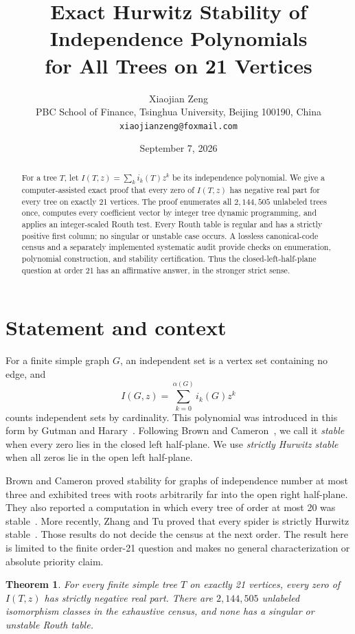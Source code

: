 \documentclass[11pt]{article}
\title{Exact Hurwitz Stability of Independence Polynomials\\
for All Trees on 21 Vertices}
\author{Xiaojian Zeng\\
\small PBC School of Finance, Tsinghua University, Beijing 100190, China\\
\small \texttt{xiaojianzeng@foxmail.com}}
\date{September 7, 2026}
\newtheorem{theorem}{Theorem}
\begin{document}
\maketitle

\begin{abstract}
For a tree $T$, let $I(T,z)=\sum_k i_k(T)z^k$ be its independence
polynomial.  We give a computer-assisted exact proof that every zero of
$I(T,z)$ has negative real part for every tree on exactly 21 vertices.
The proof enumerates all $2{,}144{,}505$ unlabeled trees once, computes every
coefficient vector by integer tree dynamic programming, and applies an
integer-scaled Routh test.  Every Routh table is regular and has a strictly
positive first column; no singular or unstable case occurs.  A lossless
canonical-code census and a separately implemented systematic audit provide
checks on enumeration, polynomial construction, and stability certification.
Thus the closed-left-half-plane question at order 21 has an affirmative
answer, in the stronger strict sense.
\end{abstract}

\section{Statement and context}

For a finite simple graph $G$, an independent set is a vertex set containing
no edge, and
\[
  I(G,z)=\sum_{k=0}^{\alpha(G)}i_k(G)z^k
\]
counts independent sets by cardinality.  This polynomial was introduced in
this form by Gutman and Harary~\cite{GutmanHarary1983}.  Following Brown and
Cameron~\cite{BrownCameron2018}, we call it \emph{stable} when every zero lies
in the closed left half-plane.  We use \emph{strictly Hurwitz stable} when all
zeros lie in the open left half-plane.

Brown and Cameron proved stability for graphs of independence number at most
three and exhibited trees with roots arbitrarily far into the open right
half-plane.  They also reported a computation in which every tree of order at
most 20 was stable~\cite{BrownCameron2018}.  More recently, Zhang and Tu proved
that every spider is strictly Hurwitz stable~\cite{ZhangTu2026}.  Those results
do not decide the census at the next order.  The result here is limited to the
finite order-21 question and makes no general characterization or absolute
priority claim.

\begin{theorem}\label{thm:main}
For every finite simple tree $T$ on exactly 21 vertices, every zero of
$I(T,z)$ has strictly negative real part.  There are $2{,}144{,}505$ unlabeled
isomorphism classes in the exhaustive census, and none has a singular or
unstable Routh table.
\end{theorem}
\end{document}
